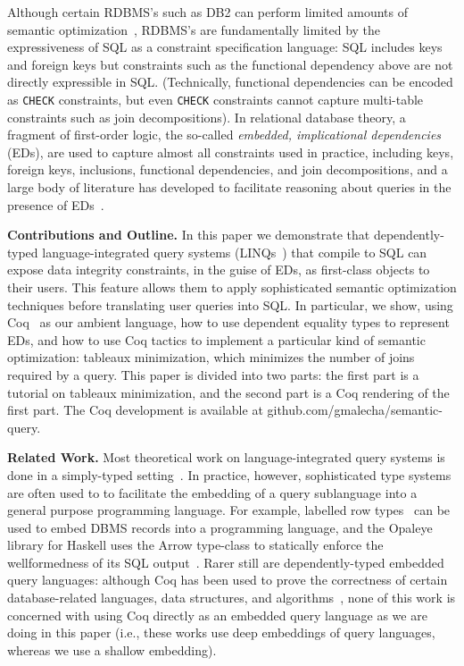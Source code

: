 \documentclass[preprint]{sigplanconf}
\begin{document}
Although certain RDBMS's such as DB2 can perform limited amounts of semantic optimization~\cite{Cheng:1999:ITS:645925.671357}, RDBMS's are fundamentally limited by the expressiveness of SQL as a constraint specification language: SQL includes keys and foreign keys but constraints such as the functional dependency above are not directly expressible in SQL.  (Technically, functional dependencies can be encoded as {\tt CHECK} constraints, but even {\tt CHECK} constraints cannot capture multi-table constraints such as join decompositions).  In relational database theory, a fragment of first-order logic, the so-called {\it embedded, implicational dependencies} (EDs), are used to capture almost all constraints used in practice, including keys, foreign keys, inclusions, functional dependencies, and join decompositions, and a large body of literature has developed to facilitate reasoning about queries in the presence of EDs~\cite{Popa99anequational}. 

{\bf Contributions and Outline.} In this paper we demonstrate that dependently-typed language-integrated query systems (LINQs~\cite{monad}) that compile to SQL can expose data integrity constraints, in the guise of EDs, as first-class objects to their users. This feature allows them to apply sophisticated semantic optimization techniques before translating user queries into SQL.  In particular, we show, using Coq~\cite{coq:coq} as our ambient language, how to use dependent equality types to represent EDs, and how to use Coq tactics to implement a particular kind of semantic optimization: tableaux minimization, which minimizes the number of joins required by a query.  This paper is divided into two parts: the first part is a tutorial on tableaux minimization, and the second part is a Coq rendering of the first part. The Coq development is available at {\sf github.com/gmalecha/semantic-query}.

{\bf Related Work.} Most theoretical work on language-integrated query systems is done in a simply-typed setting~\cite{tannen:1992:NEQ:645500.655920}.  In practice, however, sophisticated type systems are often used to to facilitate the embedding of a query sublanguage into a general purpose programming language.  For example, labelled row types~\cite{mpj:jones1996a} can be used to embed DBMS records into a programming language, and the Opaleye library for Haskell uses the Arrow type-class to statically enforce the wellformedness of its SQL output~\cite{opaleye}.  Rarer still are dependently-typed embedded query languages: although Coq has been used to prove the correctness of certain database-related languages, data structures, and algorithms~\cite{DBLP:conf/popl/DelawarePGC15,Malecha:2010:TVR:1706299.1706329,coqdb}, none of this work is concerned with using Coq directly as an embedded query language as we are doing in this paper (i.e., these works use deep embeddings of query languages, whereas we use a shallow embedding).  
\end{document}
